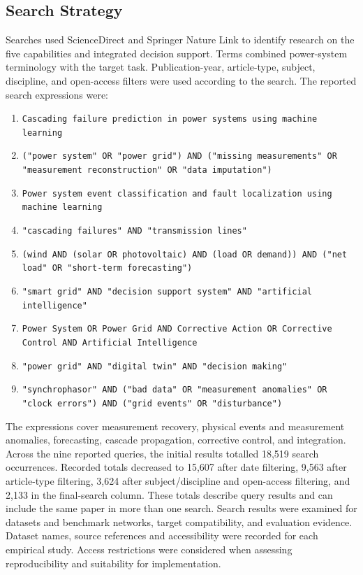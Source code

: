 \documentclass[journal,letterpaper]{IEEEtran}
\begin{document}
\subsection{Search Strategy}
Searches used ScienceDirect and Springer Nature Link to identify research on the five capabilities and integrated decision support. Terms combined power-system terminology with the target task. Publication-year, article-type, subject, discipline, and open-access filters were used according to the search. The reported search expressions were:
\begin{enumerate}
\item \texttt{Cascading failure prediction in power systems using machine learning}
\item \texttt{("power system" OR "power grid") AND ("missing measurements" OR "measurement reconstruction" OR "data imputation")}
\item \texttt{Power system event classification and fault localization using machine learning}
\item \texttt{"cascading failures" AND "transmission lines"}
\item \texttt{(wind AND (solar OR photovoltaic) AND (load OR demand)) AND ("net load" OR "short-term forecasting")}
\item \texttt{"smart grid" AND "decision support system" AND "artificial intelligence"}
\item \texttt{Power System OR Power Grid AND Corrective Action OR Corrective Control AND Artificial Intelligence}
\item \texttt{"power grid" AND "digital twin" AND "decision making"}
\item \texttt{"synchrophasor" AND ("bad data" OR "measurement anomalies" OR "clock errors") AND ("grid events" OR "disturbance")}
\end{enumerate}
The expressions cover measurement recovery, physical events and measurement anomalies, forecasting, cascade propagation, corrective control, and integration. Across the nine reported queries, the initial results totalled 18,519 search occurrences. Recorded totals decreased to 15,607 after date filtering, 9,563 after article-type filtering, 3,624 after subject/discipline and open-access filtering, and 2,133 in the final-search column. These totals describe query results and can include the same paper in more than one search. Search results were examined for datasets and benchmark networks, target compatibility, and evaluation evidence. Dataset names, source references and accessibility were recorded for each empirical study. Access restrictions were considered when assessing reproducibility and suitability for implementation.
\end{document}
